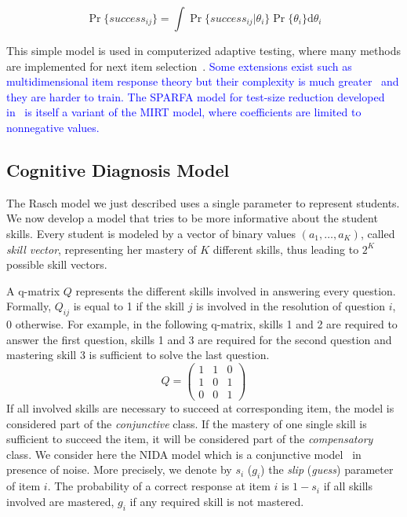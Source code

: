 \documentclass{sig-alternate}
\newcommand\note[1]{\textcolor{blue}{#1}}
\begin{document}
\[ \Pr\{success_{ij}\} = \int \Pr\{success_{ij}|\theta_i\} \Pr\{\theta_i\} \mathrm d\theta_i \]

This simple model is used in computerized adaptive testing, where many methods are implemented for next item selection~\cite{MagisRaiche2012}. \note{Some extensions exist such as multidimensional item response theory but their complexity is much greater~\cite{Desmarais2012} and they are harder to train. The SPARFA model for test-size reduction developed in~\cite{Vats2013} is itself a variant of the MIRT model, where coefficients are limited to nonnegative values.}

\subsection{Cognitive Diagnosis Model}

The Rasch model we just described uses a single parameter to represent students. We now develop a model that tries to be more informative about the student skills. Every student is modeled by a vector of binary values $(a_1, \ldots, a_K)$, called \emph{skill vector}, representing her mastery of $K$ different skills, thus leading to $2^K$ possible skill vectors. 

A q-matrix $Q$ \cite{Tatsuoka1983} represents the different skills involved in answering every question. Formally, $Q_{ij}$ is equal to 1 if the skill $j$ is involved in the resolution of question $i$, 0 otherwise. For example, in the following q-matrix, skills 1 and 2 are required to answer the first question, skills 1 and 3 are required for the second question and mastering skill 3 is sufficient to solve the last question.
\[ Q = \left(\begin{array}{lll}
1 & 1 & 0\\
1 & 0 & 1\\
0 & 0 & 1
\end{array}\right) \]
If all involved skills are necessary to succeed at corresponding item, the model is considered part of the \emph{conjunctive} class. 
If the mastery of one single skill is sufficient to succeed the item, it will be considered part of the \emph{compensatory} class. We consider here the NIDA model which is a conjunctive model~\cite{Desmarais2012} in presence of noise. More precisely, we denote by $s_i$ ($g_i$) the \emph{slip} (\emph{guess}) parameter of item $i$. The probability of a correct response at item $i$ is $1 - s_i$ if all skills involved are mastered, $g_i$ if any required skill is not mastered.
\end{document}
